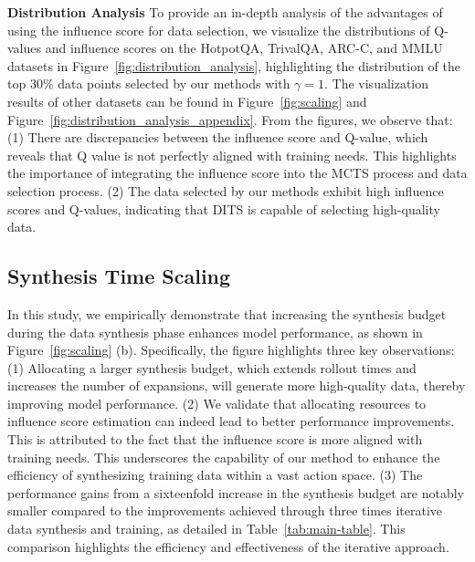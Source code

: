 \textbf{Distribution Analysis} 
To provide an in-depth analysis of the advantages of using the influence score for data selection, we visualize the distributions of Q-values and influence scores on the HotpotQA, TrivalQA, ARC-C, and MMLU datasets in Figure~\ref{fig:distribution_analysis}, highlighting the distribution of the top 30\% data points selected by our methods with $\gamma=1$. The visualization results of other datasets can be found in Figure~\ref{fig:scaling} and Figure~\ref{fig:distribution_analysis_appendix}. From the figures, we observe that: (1) There are discrepancies between the influence score and Q-value, which reveals that Q value is not perfectly aligned with training needs. This highlights the importance of integrating the influence score into the MCTS process and data selection process. (2) The data selected by our methods exhibit high influence scores and Q-values, indicating that DITS is capable of selecting high-quality data.

\subsection{Synthesis Time Scaling}
\label{subsection:synthesis time scaling}

In this study, we empirically demonstrate that increasing the synthesis budget during the data synthesis phase enhances model performance, as shown in Figure~\ref{fig:scaling} (b). Specifically, the figure highlights three key observations: (1) Allocating a larger synthesis budget, which extends rollout times and increases the number of expansions, will generate more high-quality data, thereby improving model performance. (2) We validate that allocating resources to influence score estimation can indeed lead to better performance improvements. This is attributed to the fact that the influence score is more aligned with training needs. This underscores the capability of our method to enhance the efficiency of synthesizing training data within a vast action space.
(3) The performance gains from a sixteenfold increase in the synthesis budget are notably smaller compared to the improvements achieved through three times iterative data synthesis and training, as detailed in Table~\ref{tab:main-table}. This comparison highlights the efficiency and effectiveness of the iterative approach. 


